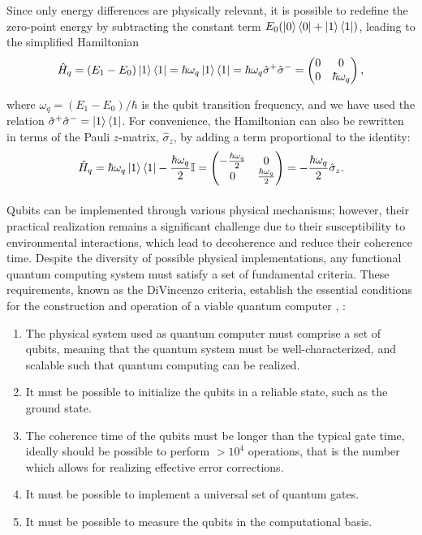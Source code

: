 Since only energy differences are physically relevant, it is possible to redefine the zero-point energy by subtracting the constant term $E_0 (\ket{0} \bra{0} + \ket{1} \bra{1})$, leading to the simplified Hamiltonian
\begin{equation}\label{eq:qubithamiltonian}
    \hat{H}_q = (E_1 - E_0) \ket{1} \bra{1} = \hbar \omega_q \ket{1} \bra{1} = \hbar \omega_q \hat{\sigma}^{+} \hat{\sigma}^{-} = 
    \begin{pmatrix}
        0 & 0 \\
        0 & \hbar \omega_q
    \end{pmatrix},
\end{equation}

where $\omega_q = (E_1 - E_0)/\hbar$ is the qubit transition frequency, and we have used the relation $\hat{\sigma}^{+} \hat{\sigma}^{-} = \ket{1} \bra{1}$.
For convenience, the Hamiltonian can also be rewritten in terms of the Pauli $z$-matrix, $\hat{\sigma}_z$, by adding a term proportional to the identity:
\begin{equation}
    \hat{H}_q = \hbar \omega_q \ket{1} \bra{1} - \frac{\hbar \omega_q}{2}\mathbb{I} = 
    \begin{pmatrix}
        -\frac{\hbar \omega_q}{2} & 0 \\
        0 & \frac{\hbar \omega_q}{2}
    \end{pmatrix} = -\frac{\hbar \omega_q}{2} \hat{\sigma}_z.
\end{equation}

\paragraph{}
Qubits can be implemented through various physical mechanisms; however, their practical realization remains a significant challenge due to their susceptibility to environmental interactions, which lead to decoherence and reduce their coherence time. 
Despite the diversity of possible physical implementations, any functional quantum computing system must satisfy a set of fundamental criteria. 
These requirements, known as the DiVincenzo criteria, establish the essential conditions for the construction and operation of a viable quantum computer \cite{DiVincenzo_2000}, \cite{manenti_quantum_2023}:
\begin{enumerate}
    \item The physical system used as quantum computer must comprise a set of qubits, meaning that the quantum system must be well-characterized, and scalable such that quantum
    computing can be realized.
    \item It must be possible to initialize the qubits in a reliable state, such as the ground state.
    \item The coherence time of the qubits must be longer than the typical gate time, ideally should be possible to perform $>10^4$ operations, that is the number which allows for realizing effective error corrections.
    \item It must be possible to implement a universal set of quantum gates.
    \item It must be possible to measure the qubits in the computational basis.
\end{enumerate}

